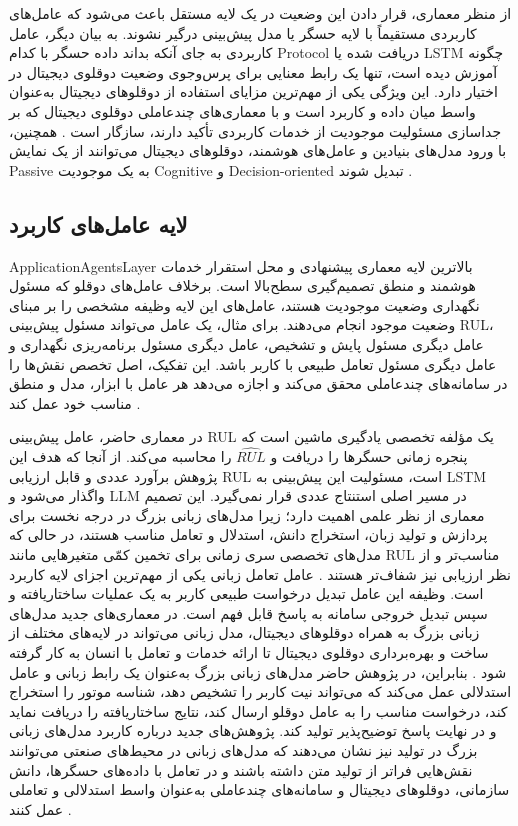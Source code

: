 \documentclass[a4paper,fleqn]{report}
\begin{document}
از منظر معماری، قرار دادن این وضعیت در یک لایه مستقل باعث می‌شود که عامل‌های کاربردی مستقیماً با لایه حسگر یا مدل پیش‌بینی درگیر نشوند. به بیان دیگر، عامل کاربردی به جای آنکه بداند داده حسگر با کدام \gls{Protocol} دریافت شده یا LSTM چگونه آموزش دیده است، تنها یک رابط معنایی برای پرس‌وجوی وضعیت دوقلوی دیجیتال در اختیار دارد. این ویژگی یکی از مهم‌ترین مزایای استفاده از دوقلو‌های دیجیتال به‌عنوان واسط میان داده و کاربرد است و با معماری‌های چندعاملی دوقلوی دیجیتال که بر جداسازی مسئولیت موجودیت از خدمات کاربردی تأکید دارند، سازگار است \cite{pretel2022masdt,lopez2024madtwin,wang2024multiagent}. همچنین، با ورود مدل‌های بنیادین و عامل‌های هوشمند، دوقلوهای دیجیتال می‌توانند از یک نمایش \gls{Passive} به یک موجودیت \gls{Cognitive} و \gls{Decision-oriented} تبدیل شوند \cite{zhou2026dtai,fu2026genaidt}.


\subsection{لایه عامل‌های کاربرد}
\label{sec:layer-app-agents}

\gls{ApplicationAgentsLayer} بالاترین لایه معماری پیشنهادی و محل استقرار خدمات هوشمند و منطق تصمیم‌گیری سطح‌بالا است. برخلاف عامل‌های دوقلو که مسئول نگهداری وضعیت موجودیت هستند، عامل‌های این لایه وظیفه مشخصی را بر مبنای وضعیت موجود انجام می‌دهند. برای مثال، یک عامل می‌تواند مسئول پیش‌بینی \gls{RUL}، عامل دیگری مسئول پایش و تشخیص، عامل دیگری مسئول برنامه‌ریزی نگهداری و عامل دیگری مسئول تعامل طبیعی با کاربر باشد. این تفکیک، اصل تخصص نقش‌ها را در سامانه‌های چندعاملی محقق می‌کند و اجازه می‌دهد هر عامل با ابزار، مدل و منطق مناسب خود عمل کند \cite{dorri2018multiagent,pretel2022masdt,wang2024multiagent}.

در معماری حاضر، عامل پیش‌بینی \gls{RUL} یک مؤلفه تخصصی یادگیری ماشین است که پنجره زمانی حسگرها را دریافت و $\widehat{RUL}$ را محاسبه می‌کند. از آنجا که هدف این پژوهش برآورد عددی و قابل ارزیابی \gls{RUL} است، مسئولیت این پیش‌بینی به LSTM واگذار می‌شود و LLM در مسیر اصلی استنتاج عددی قرار نمی‌گیرد. این تصمیم معماری از نظر علمی اهمیت دارد؛ زیرا مدل‌های زبانی بزرگ در درجه نخست برای پردازش و تولید زبان، استخراج دانش، استدلال و تعامل مناسب هستند، در حالی که مدل‌های تخصصی سری زمانی برای تخمین کمّی متغیرهایی مانند \gls{RUL} مناسب‌تر و از نظر ارزیابی نیز شفاف‌تر هستند \cite{lkgstnet2026}. عامل تعامل زبانی یکی از مهم‌ترین اجزای لایه کاربرد است. وظیفه این عامل تبدیل درخواست طبیعی کاربر به یک عملیات ساختاریافته و سپس تبدیل خروجی سامانه به پاسخ قابل فهم است. در معماری‌های جدید مدل‌های زبانی بزرگ به همراه دوقلو‌های دیجیتال، مدل زبانی می‌تواند در لایه‌های مختلف از ساخت و بهره‌برداری دوقلوی دیجیتال تا ارائه خدمات و تعامل با انسان به کار گرفته شود \cite{CHEN2025102982LLMDT,zhou2026dtai}. بنابراین، در پژوهش حاضر مدل‌های زبانی بزرگ به‌عنوان یک رابط زبانی و عامل استدلالی عمل می‌کند که می‌تواند نیت کاربر را تشخیص دهد، شناسه موتور را استخراج کند، درخواست مناسب را به عامل دوقلو ارسال کند، نتایج ساختاریافته را دریافت نماید و در نهایت پاسخ توضیح‌پذیر تولید کند. پژوهش‌های جدید درباره کاربرد مدل‌های زبانی بزرگ در تولید نیز نشان می‌دهند که مدل‌های زبانی در محیط‌های صنعتی می‌توانند نقش‌هایی فراتر از تولید متن داشته باشند و در تعامل با داده‌های حسگرها، دانش سازمانی، دوقلو‌های دیجیتال و سامانه‌های چندعاملی به‌عنوان واسط استدلالی و تعاملی عمل کنند \cite{maghanaki2026llmmanufacturing}.
\end{document}
